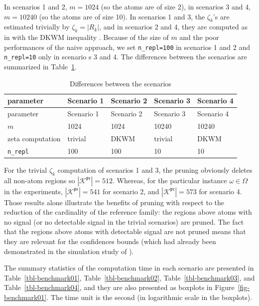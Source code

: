 \documentclass[
  11pt,
  a4paper,
]{article}
\theoremstyle{plain}
\theoremstyle{plain}
\theoremstyle{plain}
\theoremstyle{definition}
\theoremstyle{definition}
\theoremstyle{remark}
\begin{document}
In scenarios 1 and 2, \(m=1024\) (so the atoms are of size 2), in
scenarios 3 and 4, \(m=10240\) (so the atoms are of size 10). In
scenarios 1 and 3, the \(\zeta_k\)'s are estimated trivially by
\(\zeta_k=|R_k|\), and in scenarios 2 and 4, they are computed as in
\citet{MR4178188} with the DKWM inequality \citetext{\citealp[
]{MR0083864}; \citealp{MR1062069}}. Because of the size of \(m\) and the
poor performances of the naive approach, we set \texttt{n\_repl=100} in
scenarios 1 and 2 and \texttt{n\_repl=10} only in scenario s 3 and 4.
The differences between the scenarios are summarized in
Table~\ref{tbl-scenarios}.

\begin{longtable}[]{@{}lllll@{}}
\caption{Differences between the
scenarios}\label{tbl-scenarios}\tabularnewline
\toprule\noalign{}
parameter & Scenario 1 & Scenario 2 & Scenario 3 & Scenario 4 \\
\midrule\noalign{}
\endfirsthead
\toprule\noalign{}
parameter & Scenario 1 & Scenario 2 & Scenario 3 & Scenario 4 \\
\midrule\noalign{}
\endhead
\bottomrule\noalign{}
\endlastfoot
\(m\) & 1024 & 1024 & 10240 & 10240 \\
zeta computation & trivial & DKWM & trivial & DKWM \\
\texttt{n\_repl} & 100 & 100 & 10 & 10 \\
\end{longtable}

For the trivial \(\zeta_k\) computation of scenarios 1 and 3, the
pruning obviously deletes all non-atom regions so
\(|\mathcal{K}^{\mathfrak{pr}}|=512\). Whereas, for the particular
instance \(\omega\in\Omega\) in the experiments,
\(|\mathcal{K}^{\mathfrak{pr}}|=541\) for scenario 2, and
\(|\mathcal{K}^{\mathfrak{pr}}|=573\) for scenario 4. Those results
alone illustrate the benefits of pruning with respect to the reduction
of the cardinality of the reference family: the regions above atoms with
no signal (or no detectable signal in the trivial scenarios) are pruned.
The fact that the regions above atoms with detectable signal are not
pruned means that they are relevant for the confidences bounds (which
had already been demonstrated in the simulation study of
\citet{MR4178188}).

The summary statistics of the computation time in each scenario are
presented in Table~\ref{tbl-benchmark01}, Table~\ref{tbl-benchmark02},
Table~\ref{tbl-benchmark03}, and Table~\ref{tbl-benchmark04}, and they
are also presented as boxplots in Figure~\ref{fig-benchmark01}. The time
unit is the second (in logarithmic scale in the boxplots).
\end{document}
